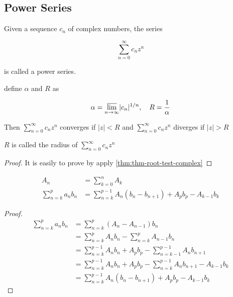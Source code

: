 \subsection{Power Series}

\begin{definition}
    Given a sequence $c_n$ of complex numbers, the series

    \[
        \sum_{n=0}^{\infty} c_nz^n
    \]

    is called a power series.
\end{definition}

\begin{thm}
    define $\alpha$ and $R$ as

    \[
        \alpha = \varlimsup_{n \to \infty} \lvert c_n\rvert^{1/n},\quad R = \frac{1}{\alpha}
    \]

    Then $\sum_{n=0}^{\infty} c_nz^n$ converges if $\lvert z \rvert < R$ and 
$\sum_{n=0}^{\infty} c_nz^n$ diverges if $\lvert z \rvert > R$

    $R$ is called the radius of $\sum_{n=0}^{\infty} c_nz^n$
\end{thm}

\begin{proof}
    It is easily to prove by apply \autoref{thm:thm-root-test-complex}
\end{proof}

\begin{thm}
    \label{thm:sum-by-parts} 

\begin{align*}
    A_n &= \sum_{k=0}^{n}A_k \\
    \sum_{n=k}^{p} a_nb_n &= \sum_{n=k}^{p-1}A_n(b_n - b_{n+1}) + A_pb_p - A_{k-1}b_k
\end{align*}
    
\end{thm}

\begin{proof}
    \begin{align*}
     \sum_{n=k}^{p} a_nb_n &= \sum_{n=k}^{p}(A_n - A_{n-1})b_n \\   
     &= \sum_{n=k}^{p}A_nb_n- \sum_{n=k}^{p}A_{n-1}b_n \\
     &= \sum_{n=k}^{p-1}A_nb_n + A_pb_p - \sum_{n=k-1}^{p-1}A_{n}b_{n+1} \\
     &= \sum_{n=k}^{p-1}A_nb_n + A_pb_p - \sum_{n=k}^{p-1}A_{n}b_{n+1} - A_{k-1}b_k \\
     &= \sum_{n=k}^{p-1}A_n(b_n - b_{n+1}) + A_pb_p - A_{k-1}b_k
    \end{align*} 
\end{proof}

